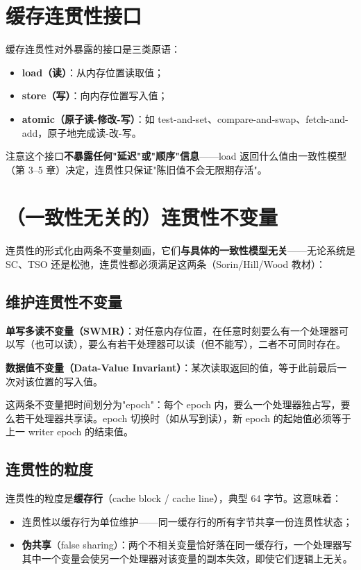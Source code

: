 \section{缓存连贯性接口}

缓存连贯性对外暴露的接口是三类原语：

\begin{itemize}
\item \textbf{load（读）}：从内存位置读取值；
\item \textbf{store（写）}：向内存位置写入值；
\item \textbf{atomic（原子读-修改-写）}：如 test-and-set、compare-and-swap、fetch-and-add，原子地完成读-改-写。
\end{itemize}


注意这个接口\textbf{不暴露任何"延迟"或"顺序"信息}——load 返回什么值由一致性模型（第 3–5 章）决定，连贯性只保证"陈旧值不会无限期存活"。

\section{（一致性无关的）连贯性不变量}

连贯性的形式化由两条不变量刻画，它们\textbf{与具体的一致性模型无关}——无论系统是 SC、TSO 还是松弛，连贯性都必须满足这两条（Sorin/Hill/Wood 教材）：

\subsection{维护连贯性不变量}

\textbf{单写多读不变量（SWMR）}：对任意内存位置，在任意时刻要么有一个处理器可以写（也可以读），要么有若干处理器可以读（但不能写），二者不可同时存在。

\textbf{数据值不变量（Data-Value Invariant）}：某次读取返回的值，等于此前最后一次对该位置的写入值。

这两条不变量把时间划分为"epoch"：每个 epoch 内，要么一个处理器独占写，要么若干处理器共享读。epoch 切换时（如从写到读），新 epoch 的起始值必须等于上一 writer epoch 的结束值。

\subsection{连贯性的粒度}

连贯性的粒度是\textbf{缓存行}（cache block / cache line），典型 64 字节。这意味着：

\begin{itemize}
\item 连贯性以缓存行为单位维护——同一缓存行的所有字节共享一份连贯性状态；
\item \textbf{伪共享}（false sharing）：两个不相关变量恰好落在同一缓存行，一个处理器写其中一个变量会使另一个处理器对该变量的副本失效，即使它们逻辑上无关。
\end{itemize}


